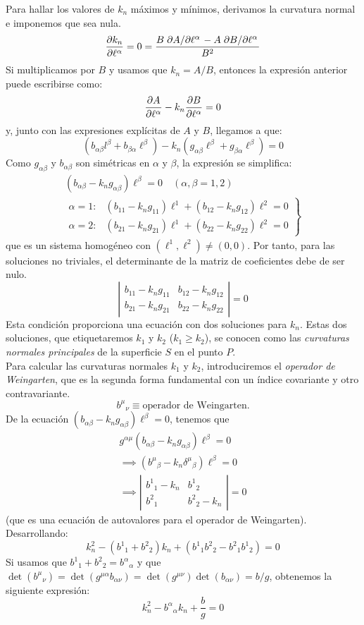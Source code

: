 Para hallar los valores de $k_n$ máximos y mínimos, derivamos la curvatura normal e imponemos que sea nula.
$$
\pdv{k_n}{\ell ^\alpha }=0=\frac{B\pdv*{A}{\ell ^\alpha }-A\pdv*{B}{\ell ^\alpha }}{B^2}
$$
Si multiplicamos por $B$ y usamos que $k_n=A/B$, entonces la expresión anterior puede escribirse como:
$$
\pdv{A}{\ell^\alpha }-k_n\pdv{B}{\ell ^\alpha }=0
$$
y, junto con las expresiones explícitas de $A$ y $B$, llegamos a que:
$$
(b_{\alpha \beta }l^\beta +b_{\beta \alpha }\ell ^\beta )-k_n(g_{\alpha \beta }\ell ^\beta +g_{\beta \alpha }\ell ^\beta )=0
$$
Como $g_{\alpha \beta }$ y $b_{\alpha \beta}$ son simétricas en $\alpha $ y $\beta $, la expresión se simplifica:
\begin{gather*}
    (b_{\alpha \beta }-k_ng_{\alpha \beta})\ell ^\beta =0 \quad (\alpha ,\beta =1,2)\\
    \left .\begin{array}{cc}
         \alpha =1:&(b_{11}-k_ng_{11})\ell ^1+(b_{12}-k_ng_{12})\ell^2=0  \\
         \alpha =2:&(b_{21}-k_ng_{21})\ell ^1+(b_{22}-k_ng_{22})\ell^2=0
    \end{array} \right \} 
\end{gather*}
que es un sistema homogéneo con $(\ell^1,\ell^2)\neq (0,0)$. Por tanto, para las soluciones no triviales, el determinante de la matriz de coeficientes debe de ser nulo.
$$
\left | \begin{array}{cc}
     b_{11}-k_ng_{11}&b_{12}-k_ng_{12}  \\
     b_{21}-k_ng_{21}&b_{22}-k_ng_{22} 
\end{array} \right |=0
$$
Esta condición proporciona una ecuación con dos soluciones para $k_n$. Estas dos soluciones, que etiquetaremos $k_1$ y $k_2$ ($k_1\ge k_2$), se conocen como las \emph{curvaturas normales principales} de la superficie $S$ en el punto $P$.\\

Para calcular las curvaturas normales $k_1$ y $k_2$, introduciremos el \emph{operador de Weingarten}, que es la segunda forma fundamental con un índice covariante y otro contravariante.
$$
b^\mu {}_\nu \equiv \text{operador de Weingarten.}
$$
De la ecuación $(b_{\alpha \beta }-k_ng_{\alpha \beta})\ell ^\beta =0$, tenemos que 
\begin{gather*}
    g^{\alpha \mu}(b_{\alpha \beta }-k_ng_{\alpha \beta})\ell ^\beta =0\\
    \implies (b^\mu {}_\beta -k_n \delta ^\mu {}_\beta )\ell ^\beta =0\\
    \implies \left | \begin{array}{cc}
        b^1{}_1-k_n &b^1{}_2  \\
         b^2{}_1&b^2{}_2-k_n 
    \end{array} \right |=0
\end{gather*}
(que es una ecuación de autovalores para el operador de Weingarten). Desarrollando: 
$$
k_n^2-(b^1{}_1+b^2{}_2)k_n+(b^1{}_1b^2{}_2-b^2{}_1b^1{}_2)=0
$$
Si usamos que $b^1{}_1+b^2{}_2=b^\alpha {}_\alpha $ y que $\det(b^\mu {}_\nu )=\det(g^{\mu \alpha }b_{\alpha \nu})=\det(g^{\mu \nu })\det(b_{\alpha \nu})=b/g$, obtenemos la siguiente expresión:
$$
\boxed{k_n^2-b^\alpha {}_\alpha k_n+\frac{b}{g}=0}
$$

